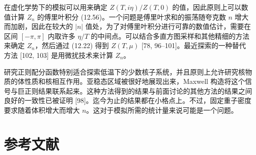 在虚化学势下的模拟可以用来确定 $Z(T,i\eta)/Z(T,0)$ 的值，因此原则上可以数值计算 $Z_n$ 的傅里叶积分 (12.56)。一个问题是傅里叶求和的振荡随夸克数 $n$ 增大而加剧，因此在较大的 $|n|$ 值处，为了对傅里叶积分进行可靠的数值估计，需要在区间 $[-\pi,\pi]$ 内取许多 $\eta/T$ 的中间点。可以结合多直方图采样和其他精细的方法来确定 $Z_n$，然后通过 (12.22) 得到 $Z(T,\mu)$ [78, 96--101]。最近探索的一种替代方法 [102, 103] 是用微扰技术来计算 $Z_n$。

研究正则配分函数特别适合探索低温下的少数核子系统，并且原则上允许研究核物质的体性质和核相互作用。亚稳态区域被很好地展现出来，Maxwell 构造将这个信号与巨正则结果联系起来。这种方法得到的结果与前面讨论的其他方法的结果之间良好的一致性已被证明 [98]。迄今为止的结果都在小格点上。不过，固定重子密度要求随着体积增大而增大 $n$。这对于模拟所需的统计量来说可能是一个问题。


\section*{参考文献}

